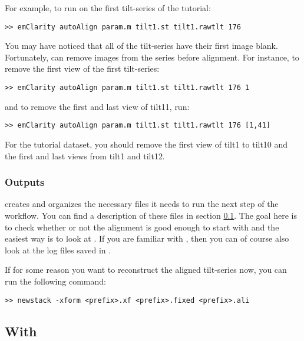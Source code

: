For example, to run  on the first tilt-series of the tutorial:
\begin{lstlisting}
>> emClarity autoAlign param.m tilt1.st tilt1.rawtlt 176
\end{lstlisting}


You may have noticed that all of the tilt-series have their first image blank. Fortunately,  can remove images from the series before alignment. For instance, to remove the first view of the first tilt-series:
\begin{lstlisting}
>> emClarity autoAlign param.m tilt1.st tilt1.rawtlt 176 1
\end{lstlisting}
and to remove the first and last view of tilt11, run:
\begin{lstlisting}
>> emClarity autoAlign param.m tilt1.st tilt1.rawtlt 176 [1,41]
\end{lstlisting}
\begin{note}For the tutorial dataset, you should remove the first view of tilt1 to tilt10 and the first and last views from tilt1 and tilt12.
\end{note}


\subsubsection{Outputs}

{\emClarity} creates and organizes the necessary files it needs to run the next step of the workflow. You can find a description of these files in section \ref{sec:tilt_series_alignment:ETomo}. The goal here is to check whether or not the alignment is good enough to start with and the easiest way is to look at .
If you are familiar with {\ETomo}, then you can of course also look at the log files saved in .

If for some reason you want to reconstruct the aligned tilt-series now, you can run the following command:
\begin{lstlisting}
>> newstack -xform <prefix>.xf <prefix>.fixed <prefix>.ali
\end{lstlisting}


\subsection{With {\ETomo}} \label{sec:tilt_series_alignment:ETomo}

